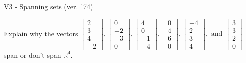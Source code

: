\begin{exercise}
  \begin{exerciseTitle}V3 - Spanning sets (ver. 174)\end{exerciseTitle}
  \begin{exerciseStatement}
    Explain why the vectors \(\left[\begin{array}{r}
2 \\
3 \\
4 \\
-2
\end{array}\right] , \left[\begin{array}{r}
0 \\
-2 \\
-3 \\
0
\end{array}\right] , \left[\begin{array}{r}
4 \\
0 \\
-1 \\
-4
\end{array}\right] , \left[\begin{array}{r}
0 \\
4 \\
6 \\
0
\end{array}\right] , \left[\begin{array}{r}
-4 \\
2 \\
3 \\
4
\end{array}\right] , \text{ and } \left[\begin{array}{r}
3 \\
3 \\
2 \\
0
\end{array}\right]\) span or don't span \(\mathbb{R}^4\). 
	



\end{exerciseStatement}
\end{exercise}
